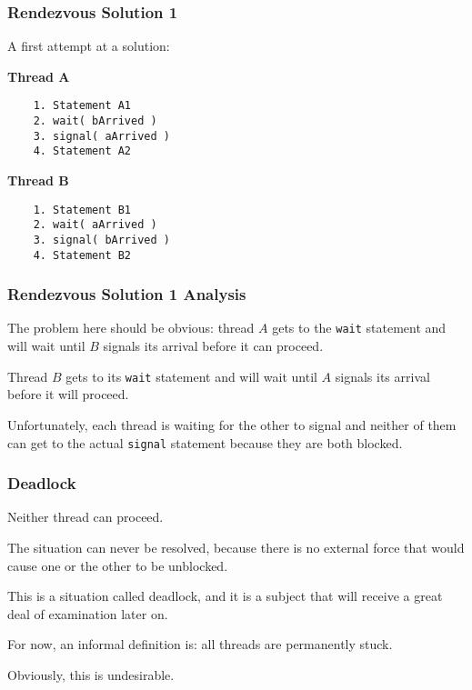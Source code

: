 \begin{frame}[fragile]
\frametitle{Rendezvous Solution 1}

A first attempt at a solution: 

\begin{multicols}{2}
\textbf{Thread A}
  \begin{verbatim}
	1. Statement A1
	2. wait( bArrived )
	3. signal( aArrived )
	4. Statement A2
  \end{verbatim}
\columnbreak
\textbf{Thread B}
  \begin{verbatim}
	1. Statement B1
	2. wait( aArrived )
	3. signal( bArrived )
	4. Statement B2
  \end{verbatim}
\end{multicols}
\vspace{-2em}


\end{frame}

\begin{frame}
\frametitle{Rendezvous Solution 1 Analysis}

The problem here should be obvious: thread $A$ gets to the \texttt{wait} statement and will wait until $B$ signals its arrival before it can proceed. 

Thread $B$ gets to its \texttt{wait} statement and will wait until $A$ signals its arrival before it will proceed. 

Unfortunately, each thread is waiting for the other to signal and neither of them can get to the actual \texttt{signal} statement because they are both blocked. 


\end{frame}

\begin{frame}
\frametitle{Deadlock}

Neither thread can proceed. 

The situation can never be resolved, because there is no external force that would cause one or the other to be unblocked. 

This is a situation called \alert{deadlock}, and it is a subject that will receive a great deal of examination later on. 

For now, an informal definition is: all threads are permanently stuck. 

Obviously, this is undesirable.

\end{frame}

